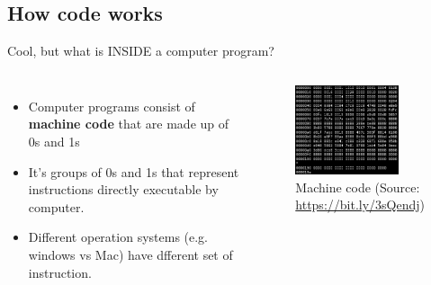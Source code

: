 \documentclass[10pt,xcolor={table,dvipsnames},t]{beamer}
\begin{document}

\subsection{How code works}

\begin{frame}{Cool, but what is INSIDE a computer program?}
  \begin{columns}
    \begin{itemize}
      \item Computer programs consist of \textbf{machine code} that are made up of 0s and 1s
      \item It's groups of 0s and 1s that represent instructions directly executable by computer.
      \item Different operation systems (e.g. windows vs Mac) have dfferent set of instruction.
    \end{itemize}
  

    \begin{figure}
      \includegraphics[width=0.8\textwidth]{img/machine-code.png}
      \caption{Machine code (Source: \href{https://bit.ly/3sQendj}{https://bit.ly/3sQendj})}
      \label{fig:machine_code}
    \end{figure}
  \end{columns}

\end{frame}
\end{document}
